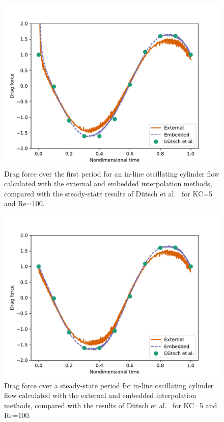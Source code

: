 \documentclass[preprint,12pt]{elsarticle}
\begin{document}
\begin{figure}[htbp]
    \centering
    \includegraphics[width=0.75\linewidth]{static_init.pdf}
    \caption{Drag force over the first period for an in-line oscillating cylinder flow
    calculated with the external and embedded interpolation methods, compared with the
    steady-state results of D\"{u}tsch et al.~\cite{dutsch1998low} for KC=5 and Re=100.
    }
    \label{fig:staticInit}
\end{figure}

\begin{figure}[htbp]
    \centering
    \includegraphics[width=0.75\linewidth]{static_ss.pdf}
    \caption{Drag force over a steady-state period for in-line oscillating cylinder flow
    calculated with the external and embedded interpolation methods, compared with
    the results of D\"{u}tsch et al.~\cite{dutsch1998low} for KC=5 and Re=100.
    }
    \label{fig:staticSteady}
\end{figure}
\end{document}
